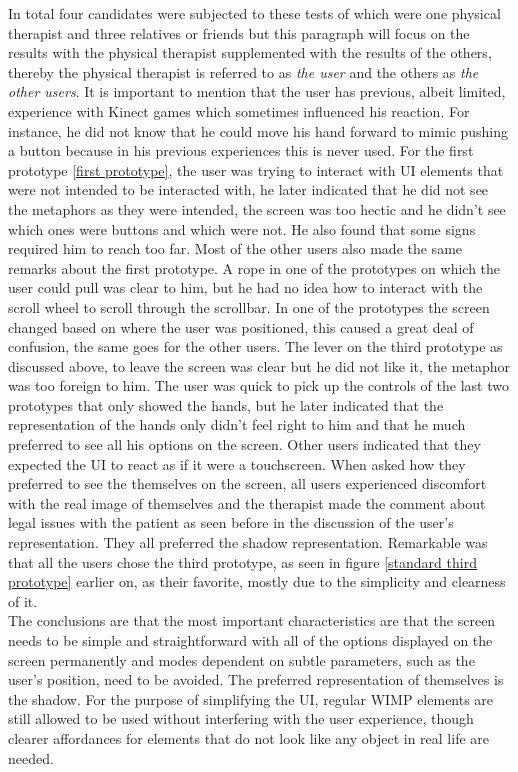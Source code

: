 In total four candidates were subjected to these tests of which were one physical therapist and three relatives or friends but this paragraph will focus on the results with the physical therapist supplemented with the results of the others, thereby the physical therapist is referred to as \emph{the user} and the others as \emph{the other users}. It is important to mention that the user has previous, albeit limited, experience with Kinect games which sometimes influenced his reaction. For instance, he did not know that he could move his hand forward to mimic pushing a button because in his previous experiences this is never used. For the first prototype \ref{first prototype}, the user was trying to interact with UI elements that were not intended to be interacted with, he later indicated that he did not see the metaphors as they were intended, the screen was too hectic and he didn't see which ones were buttons and which were not. He also found that some signs required him to reach too far. Most of the other users also made the same remarks about the first prototype. A rope in one of the prototypes on which the user could pull was clear to him, but he had no idea how to interact with the scroll wheel to scroll through the scrollbar. In one of the prototypes the screen changed based on where the user was positioned, this caused a great deal of confusion, the same goes for the other users. The lever on the third prototype as discussed above, to leave the screen was clear but he did not like it, the metaphor was too foreign to him. The user was quick to pick up the controls of the last two prototypes that only showed the hands, but he later indicated that the representation of the hands only didn't feel right to him and that he much preferred to see all his options on the screen. Other users indicated that they expected the UI to react as if it were a touchscreen. When asked how they preferred to see the themselves on the screen, all users experienced discomfort with the real image of themselves and the therapist made the comment about legal issues with the patient as seen before in the discussion of the user's representation. They all preferred the shadow representation.  Remarkable was that all the users chose the third prototype, as seen in figure \ref{standard third prototype} earlier on, as their favorite, mostly due to the simplicity and clearness of it.\\

The conclusions are that the most important characteristics are that the screen needs to be simple and straightforward with all of the options displayed on the screen permanently and modes dependent on subtle parameters, such as the user's position, need to be avoided. The preferred representation of themselves is the shadow. For the purpose of simplifying the UI, regular WIMP elements are still allowed to be used without interfering with the user experience, though clearer affordances for elements that do not look like any object in real life are needed.\\


